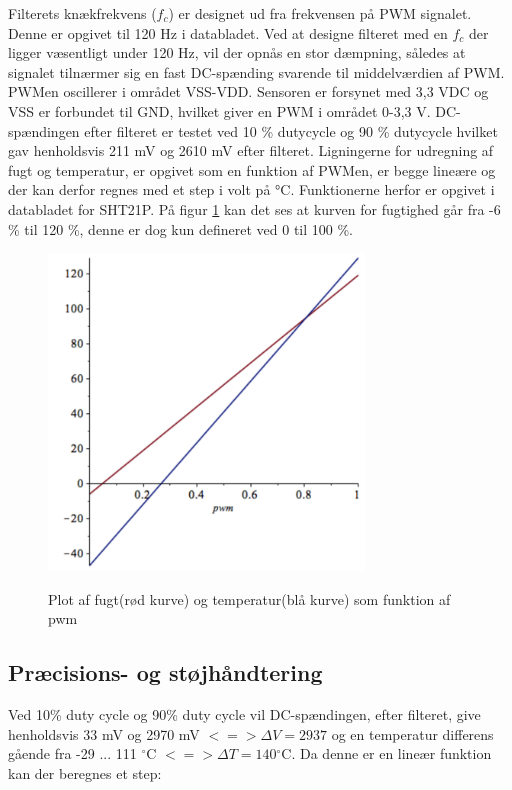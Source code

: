Filterets knækfrekvens ($f_c$) er designet ud fra frekvensen på PWM signalet. Denne er opgivet til 120 Hz i databladet. Ved at designe filteret med en $f_c$ der ligger væsentligt under 120 Hz, vil der opnås en stor dæmpning, således at signalet tilnærmer sig en fast DC-spænding svarende til middelværdien af PWM. PWMen oscillerer i området VSS-VDD. Sensoren er forsynet med 3,3 VDC og VSS er forbundet til GND, hvilket giver en PWM i området 0-3,3 V. DC-spændingen efter filteret er testet ved 10 \% dutycycle og 90 \% dutycycle hvilket gav henholdsvis 211 mV og 2610 mV efter filteret. Ligningerne for udregning af fugt og temperatur, er opgivet som en funktion af PWMen, er begge lineære og der kan derfor regnes med et step i volt på °C. Funktionerne herfor er opgivet i databladet for SHT21P. 
På figur \ref{lab:sht_plot_mable} kan det ses at kurven for fugtighed går fra -6 \% til 120 \%, denne er dog kun defineret ved 0 til 100 \%. 

\begin{figure}[H]
\centering
{\includegraphics[width=0.75\textwidth]{filer/design/Billeder/sht_plot_maple}}
\caption{Plot af fugt(rød kurve) og temperatur(blå kurve) som funktion af pwm}
\label{lab:sht_plot_mable}
\end{figure}

\subsection{Præcisions- og støjhåndtering}

Ved 10\% duty cycle og 90\% duty cycle vil DC-spændingen, efter filteret, give henholdsvis 33 mV og 2970 mV $<=> \Delta V = 2937$ og en temperatur differens gående fra -29 ... 111 ${^{\circ}}$C $<=> \Delta T = 140 {^{\circ}}$C. Da denne er en lineær funktion kan der beregnes et step:

